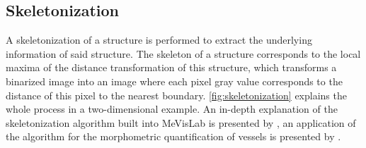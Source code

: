 \subsection{Skeletonization}
A skeletonization of a structure is performed to extract the underlying information of said structure. The skeleton of a structure corresponds to the local maxima of the distance transformation of this structure, which transforms a binarized image into an image where each pixel gray value corresponds to the distance of this pixel to the nearest boundary. \autoref{fig:skeletonization} explains the whole process in a two-dimensional example. An in-depth explanation of the skeletonization algorithm built into MeVisLab is presented by \citet{Selle2002}, an application of the algorithm for the morphometric quantification of vessels is presented by \citet{Boskamp2004}.

